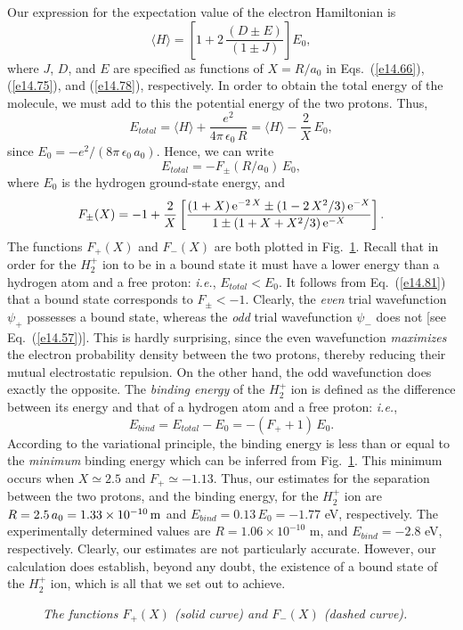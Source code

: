 Our expression for the expectation value of the electron Hamiltonian is
\begin{equation}
\langle H\rangle = \left[1+ 2\,\frac{(D\pm E)}{(1\pm J)}\right] E_0,
\end{equation}
where $J$, $D$, and $E$ are specified as functions of $X=R/a_0$ in
Eqs.~(\ref{e14.66}), (\ref{e14.75}), and (\ref{e14.78}), respectively.
In order
to obtain the total energy of the molecule, we must add to this the
potential energy of the two protons. Thus,
\begin{equation}
E_{total} = \langle H\rangle + \frac{e^2}{4\pi\,\epsilon_0\,R} = \langle H\rangle - \frac{2}{X}\,E_0,
\end{equation}
since $E_0= -e^2/(8\pi\,\epsilon_0\,a_0)$.
Hence, we can write
\begin{equation}\label{e14.81}
E_{total} = - F_\pm(R/a_0)\,E_0,
\end{equation}
where $E_0$ is the hydrogen ground-state energy, and
\begin{equation}
F_\pm(X) = -1 + \frac{2}{X}\left[\frac{(1+X)\,{\rm e}^{-2\,X}\pm(1-2\,X^2/3)
\,{\rm e}^{-X}}{1\pm (1+X+X^2/3)\,{\rm e}^{-X}}\right].
\end{equation}
The functions $F_+(X)$ and $F_-(X)$ are both plotted in Fig.~\ref{fh2pa}.
Recall that in order for  the $H_2^+$ ion to be in a bound  state it must have a lower
energy than a hydrogen atom and a free proton: {\em i.e.}, $E_{total}< E_0$. It follows from Eq.~(\ref{e14.81}) that a bound state
corresponds to $F_\pm < -1$. Clearly, the {\em even}\/ trial wavefunction $\psi_+$
possesses a bound state, whereas the {\em odd}\/ trial wavefunction $\psi_-$
does not [see Eq.~(\ref{e14.57})]. This is hardly surprising, since the
even wavefunction {\em maximizes}\/ the electron probability density between 
the two protons, thereby reducing their mutual electrostatic repulsion. On the other hand, the odd
wavefunction does exactly the opposite. The {\em binding energy}\/ of the
$H_2^+$ ion is defined as the difference between its energy and that of a
hydrogen atom and a free proton: {\em i.e.},
\begin{equation}
E_{bind} = E_{total} - E_0 = - (F_+ +1)\,E_0. 
\end{equation}
According to the variational principle, the binding energy is less than or
equal to the {\em minimum}\/ binding energy which can be inferred from Fig.~\ref{fh2pa}. 
This minimum occurs when $X\simeq 2.5$ and $F_+\simeq -1.13$. 
Thus, our estimates for the separation between the two
protons, and the binding energy, for the $H_2^+$ ion
are $R = 2.5\,a_0 = 1.33\times 10^{-10}\,{\rm m}$ and
$E_{bind} = 0.13 \,E_0 = -1.77$ eV, respectively. The experimentally
determined values   are $R=1.06\times 10^{-10}$ m, and $E_{bind}=-2.8$
eV, respectively. Clearly, our estimates are not particularly accurate. However,
our calculation does establish, beyond any doubt, the existence of
a bound state of the $H_2^+$ ion, which is all that we set out to achieve.

\begin{figure}
\epsfysize=3.5in
\centerline{}
\caption{\em The functions $F_+(X)$ (solid curve) and $F_-(X)$ (dashed curve).}\label{fh2pa}   
\end{figure}
